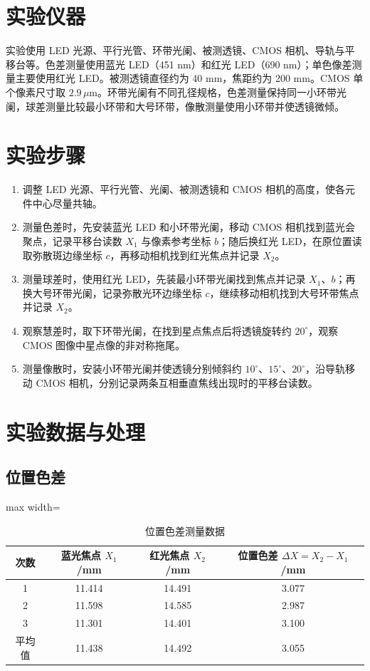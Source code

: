 \documentclass[12pt,a4paper]{article}
\begin{document}
\section{实验仪器}

实验使用 LED 光源、平行光管、环带光阑、被测透镜、CMOS 相机、导轨与平移台等。色差测量使用蓝光 LED（451 nm）和红光 LED（690 nm）；单色像差测量主要使用红光 LED。被测透镜直径约为 40 mm，焦距约为 200 mm。CMOS 单个像素尺寸取 $2.9\,\mu\mathrm{m}$。环带光阑有不同孔径规格，色差测量保持同一小环带光阑，球差测量比较最小环带和大号环带，像散测量使用小环带并使透镜微倾。

\section{实验步骤}

\begin{enumerate}
  \item 调整 LED 光源、平行光管、光阑、被测透镜和 CMOS 相机的高度，使各元件中心尽量共轴。
  \item 测量色差时，先安装蓝光 LED 和小环带光阑，移动 CMOS 相机找到蓝光会聚点，记录平移台读数 $X_1$ 与像素参考坐标 $b$；随后换红光 LED，在原位置读取弥散斑边缘坐标 $c$，再移动相机找到红光焦点并记录 $X_2$。
  \item 测量球差时，使用红光 LED，先装最小环带光阑找到焦点并记录 $X_1$、$b$；再换大号环带光阑，记录弥散光环边缘坐标 $c$，继续移动相机找到大号环带焦点并记录 $X_2$。
  \item 观察慧差时，取下环带光阑，在找到星点焦点后将透镜旋转约 $20^\circ$，观察 CMOS 图像中星点像的非对称拖尾。
  \item 测量像散时，安装小环带光阑并使透镜分别倾斜约 $10^\circ$、$15^\circ$、$20^\circ$，沿导轨移动 CMOS 相机，分别记录两条互相垂直焦线出现时的平移台读数。
\end{enumerate}

\section{实验数据与处理}

\subsection{位置色差}

\begin{table}[H]
  \centering
  \caption{位置色差测量数据}
  \begin{adjustbox}{max width=\textwidth}
    \begin{tabular}{cccc}
      \toprule
      次数 & 蓝光焦点 $X_1$/mm & 红光焦点 $X_2$/mm & 位置色差 $\Delta X=X_2-X_1$/mm\\
      \midrule
      1 & 11.414 & 14.491 & 3.077\\
      2 & 11.598 & 14.585 & 2.987\\
      3 & 11.301 & 14.401 & 3.100\\
      \midrule
      平均值 & 11.438 & 14.492 & 3.055\\
      \bottomrule
    \end{tabular}
  \end{adjustbox}
\end{table}
\end{document}
